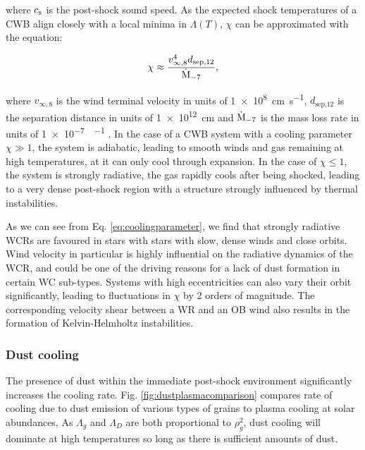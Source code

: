 \noindent
where $c_\text{s}$ is the post-shock sound speed.
As the expected shock temperatures of a CWB align closely with a local minima in $\Lambda(T)$, $\chi$ can be approximated with the equation:

\begin{equation}
  \label{eq:coolingparameter} 
  \chi \approx \frac{v^4_{\infty,8} d_\text{sep,12}}{\dot{\text{M}}_{-7}},
\end{equation}

\noindent
where $v_{\infty,8}$ is the wind terminal velocity in units of \SI{1e8}{\centi\metre\per\second}, $d_\text{sep,12}$ is the separation distance in units of \SI{1e12}{\centi\metre} and $\dot{\text{M}}_{-7}$ is the mass loss rate in units of \SI{1e-7}{\solarmass\per\year}
\parencite{stevens_colliding_1992}.
In the case of a CWB system with a cooling parameter $\chi \gg 1$, the system is adiabatic, leading to smooth winds and gas remaining at high temperatures, at it can only cool through expansion.
In the case of $\chi \leq 1$, the system is strongly radiative, the gas rapidly cools after being shocked, leading to a very dense post-shock region with a structure strongly influenced by thermal instabilities.

As we can see from Eq. \ref{eq:coolingparameter}, we find that strongly radiative WCRs are favoured in stars with stars with slow, dense winds and close orbits.
Wind velocity in particular is highly influential on the radiative dynamics of the WCR, and could be one of the driving reasons for a lack of dust formation in certain WC sub-types.
Systems with high eccentricities can also vary their orbit significantly, leading to fluctuations in $\chi$ by 2 orders of magnitude.
The corresponding velocity shear between a WR and an OB wind also results in the formation of Kelvin-Helmholtz instabilities.

\subsubsection{Dust cooling}

The presence of dust within the immediate post-shock environment significantly increases the cooling rate.
Fig. \ref{fig:dustplasmacomparison} compares rate of cooling due to dust emission of various types of grains to plasma cooling at solar abundances, 
As $\Lambda_g$ and $\Lambda_D$ are both proportional to $\rho_g^2$, dust cooling will dominate at high temperatures so long as there is sufficient amounts of dust.


